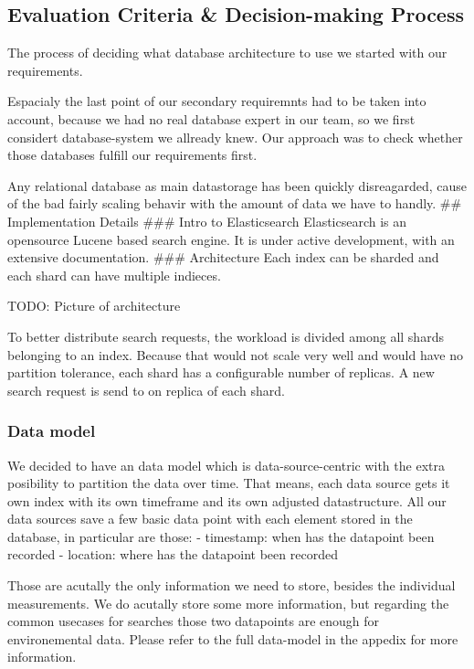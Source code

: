 \subsection{Evaluation Criteria \& Decision-making
Process}\label{evaluation-criteria-decision-making-process}

The process of deciding what database architecture to use we started
with our requirements.

Espacialy the last point of our secondary requiremnts had to be taken
into account, because we had no real database expert in our team, so we
first considert database-system we allready knew. Our approach was to
check whether those databases fulfill our requirements first.

Any relational database as main datastorage has been quickly
disreagarded, cause of the bad fairly scaling behavir with the amount of
data we have to handly. \#\# Implementation Details \#\#\# Intro to
Elasticsearch Elasticsearch is an opensource Lucene based search engine.
It is under active development, with an extensive documentation. \#\#\#
Architecture Each index can be sharded and each shard can have multiple
indieces.

TODO: Picture of architecture

To better distribute search requests, the workload is divided among all
shards belonging to an index. Because that would not scale very well and
would have no partition tolerance, each shard has a configurable number
of replicas. A new search request is send to on replica of each shard.

\subsubsection{Data model}\label{data-model}

We decided to have an data model which is data-source-centric with the
extra posibility to partition the data over time. That means, each data
source gets it own index with its own timeframe and its own adjusted
datastructure. All our data sources save a few basic data point with
each element stored in the database, in particular are those: -
timestamp: when has the datapoint been recorded - location: where has
the datapoint been recorded

Those are acutally the only information we need to store, besides the
individual measurements. We do acutally store some more information, but
regarding the common usecases for searches those two datapoints are
enough for environemental data. Please refer to the full data-model in
the appedix for more information.

